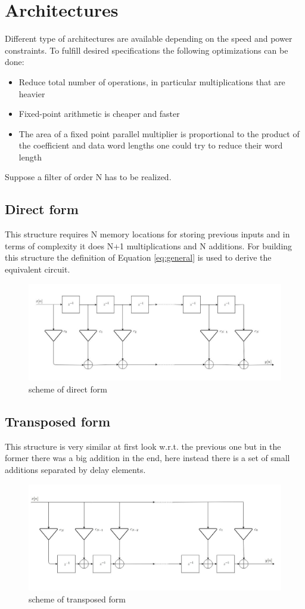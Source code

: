 \section{Architectures}
Different type of architectures are available depending on the speed and power constraints.
To fulfill desired specifications the following optimizations can be done:\\
\begin{itemize}
    \item Reduce total number of operations, in particular multiplications that are heavier
    \item Fixed-point arithmetic is cheaper and faster
    \item The area of a fixed point parallel multiplier is proportional to the product of the coefficient and data word lengths one could try to reduce their word length
\end{itemize}
Suppose a filter of order N has to be realized.
\subsection{Direct form}
This structure requires N memory locations for storing previous inputs and in terms of complexity it does N+1 multiplications and  N additions.  For building this structure the definition of Equation \ref{eq:general} is used to derive the equivalent circuit.
\begin{figure}[H]
    \centering
    \includegraphics[scale=0.45]{images/direct.jpeg}    
    \caption{scheme of direct form}
    \label{fig:my_label}
\end{figure}
\subsection{Transposed form}
This structure is very similar at first look w.r.t. the previous one but in the former there was a big addition in the end, here instead there is a set of small additions separated by delay elements.
\begin{figure}[H]
    \centering
    \includegraphics[scale=0.45]{images/transposed.jpg}    
    \caption{scheme of transposed form}
    \label{fig:transposed}
\end{figure}
